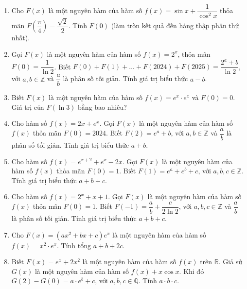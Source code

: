 \documentclass[12pt]{article}
\begin{document}
\begin{enumerate}[label=\textbf{Câu \arabic*.}, start=1]
		
		\item Cho $F(x)$ là một nguyên hàm của hàm số $f(x) = \sin x + \dfrac{1}{\cos^2 x}$ thỏa mãn $F\left(\dfrac{\pi}{4}\right) = \dfrac{\sqrt{2}}{2}$. Tính $F(0)$ (làm tròn kết quả đến hàng thập phân thứ nhất).
		
		
		\item Gọi $F(x)$ là một nguyên hàm của hàm số $f(x) = 2^x$, thỏa mãn $F(0) = \dfrac{1}{\ln 2}$. Biết $F(0) + F(1) + \dots + F(2024) + F(2025) = \dfrac{2^a + b}{\ln 2}$, với $a, b \in \mathbb{Z}$ và $\dfrac{a}{b}$ là phân số tối giản. Tính giá trị biểu thức $a - b$.
		
		
		\item Biết $F(x)$ là một nguyên hàm của hàm số $f(x) = e^x \cdot e^x$ và $F(0) = 0$. Giá trị của $F(\ln 3)$ bằng bao nhiêu?
		
		
		\item Cho hàm số $f(x) = 2x + e^x$. Gọi $F(x)$ là một nguyên hàm của hàm số $f(x)$ thỏa mãn $F(0) = 2024$. Biết $F(2) = e^a + b$, với $a, b \in \mathbb{Z}$ và $\dfrac{a}{b}$ là phân số tối giản. Tính giá trị biểu thức $a + b$.
		
		
		\item Cho hàm số $f(x) = e^{x+2} + e^x - 2x$. Gọi $F(x)$ là một nguyên hàm của hàm số $f(x)$ thỏa mãn $F(0) = 1$. Biết $F(1) = e^a + e^b + c$, với $a, b, c \in \mathbb{Z}$. Tính giá trị biểu thức $a + b + c$.
		
		
		\item Cho hàm số $f(x) = 2^x + x + 1$. Gọi $F(x)$ là một nguyên hàm của hàm số $f(x)$ thỏa mãn $F(0) = 1$. Biết $F(-1) = \dfrac{a}{b} + \dfrac{c}{2\ln 2}$, với $a, b, c \in \mathbb{Z}$ và $\dfrac{a}{b}$ là phân số tối giản. Tính giá trị biểu thức $a + b + c$.
		
		
		\item Cho $F(x) = (ax^2 + bx + c)e^x$ là một nguyên hàm của hàm số $f(x) = x^2 \cdot e^x$. Tính tổng $a + b + 2c$.
		
		
		\item Biết $F(x) = e^x + 2x^2$ là một nguyên hàm của hàm số $f(x)$ trên $\mathbb{R}$. Giả sử $G(x)$ là một nguyên hàm của hàm số $f(x) + x\cos x$. Khi đó $G(2) - G(0) = a \cdot e^b + c$, với $a, b, c \in \mathbb{Q}$. Tính $a \cdot b \cdot c$.
		

\end{enumerate}
\end{document}
